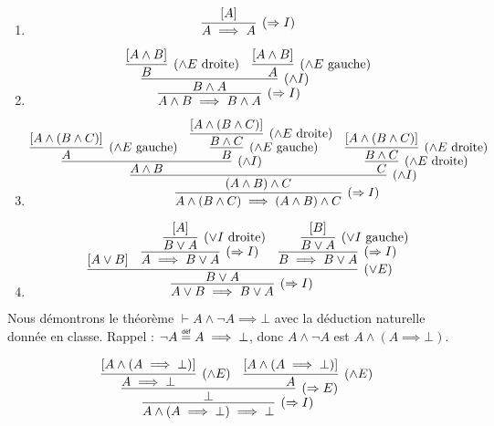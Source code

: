 \documentclass[12pt,french,a4paper]{article}
\newcommand\eqdef{\mathrel{\overset{\makebox[0pt]{\mbox{\normalfont\tiny\sffamily déf}}}{=}}}
\begin{document}
\begin{question}
\begin{enumerate}
\item
\[
\infer[(\Rightarrow{}I)] {A \implies A} {[A]}
\]

\item
\[
\infer[(\Rightarrow{}I)] {A\wedge B \implies B \wedge A} {
\infer[(\wedge I)] {B \wedge A} {
\infer[(\wedge E \text{ droite})] {B} {[A \wedge B]} & \infer[(\wedge E \text{ gauche})] {A} {[A \wedge B]}
}
}
\]

\newpage
\item
\[
\infer[(\Rightarrow{}I)] {A\wedge (B \wedge C) \implies (A\wedge B) \wedge C} {
\infer[(\wedge I)] {(A \wedge B) \wedge C} {
	\infer[(\wedge I)] {A \wedge B} {
\infer[(\wedge E \text{ gauche})] {A} {[A \wedge (B \wedge C)]} & \infer[(\wedge E \text{ gauche})] {B} {\infer[(\wedge E \text{ droite})] {B \wedge C} {[A \wedge (B \wedge C)]}} } & \infer[(\wedge E \text{ droite})] {C} {\infer[(\wedge E \text{ droite})] {B \wedge C} {[A \wedge (B \wedge C)]}} 
	}
}
\]

\item
\[
\infer[(\Rightarrow{}I)] {A\vee B \implies B \vee A} {
\infer[(\vee E)] {B \vee A}
	{
	[A \vee B]
	& \infer[(\Rightarrow{}I)] {A \implies B \vee A} {\infer[(\vee I \text{ droite})] {B \vee A} {[A]}} 
	& \infer[(\Rightarrow{}I)] {B \implies B \vee A} {\infer[(\vee I \text{ gauche})] {B \vee A} {[B]}} 
	}
}
\]

\end{enumerate}
\end{question}


\begin{question}
Nous démontrons le théorème $\vdash A \wedge \neg A \implies \bot$ avec la déduction naturelle donnée en classe. Rappel : $\neg A \eqdef A \implies \bot$, donc $A \wedge \neg A$ est $A \wedge (A \implies \bot)$.

\[
\infer[(\Rightarrow{}I)] {A \wedge (A \implies \bot) \implies \bot} {
\infer[(\Rightarrow{}E)] {\bot} {
\infer[(\wedge E)] {A \implies \bot} {[A \wedge (A \implies \bot)]} & \infer[(\wedge E)] {A} {[A \wedge (A \implies \bot)]}
}}
\]

\end{question}
\end{document}
